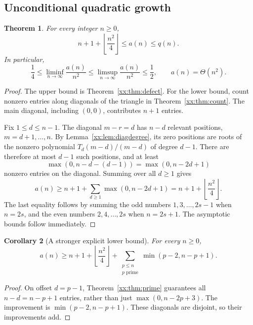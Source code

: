 \documentclass[11pt,a4paper]{article}
\numberwithin{equation}{section}
\newtheorem{theorem}{Theorem}[section]
\newtheorem{corollary}[theorem]{Corollary}
\theoremstyle{definition}
\theoremstyle{remark}
\theoremstyle{plain}
\begin{document}
\subsection{Unconditional quadratic growth}\label{xx:sec:bounds}

\begin{theorem}\label{xx:thm:bounds}
For every integer $n\ge0$,
\begin{equation}\label{xx:eq:bounds}
 n+1+\left\lfloor\frac{n^2}{4}\right\rfloor\le a(n)\le q(n).
\end{equation}
In particular,
\[
 \frac14\le\liminf_{n\to\infty}\frac{a(n)}{n^2}
 \le\limsup_{n\to\infty}\frac{a(n)}{n^2}\le\frac12,
 \qquad a(n)=\Theta(n^2).
\]
\end{theorem}
\begin{proof}
The upper bound is Theorem~\ref{xx:thm:defect}. For the lower bound, count
nonzero entries along diagonals of the triangle in
Theorem~\ref{xx:thm:count}. The main diagonal, including $(0,0)$, contributes
$n+1$ entries.

Fix $1\le d\le n-1$. The diagonal $m-r=d$ has $n-d$ relevant positions,
$m=d+1,\ldots,n$. By Lemma~\ref{xx:lem:diagdegree}, its zero positions are
roots of the nonzero polynomial $T_d(m-d)/(m-d)$ of degree $d-1$.
There are therefore at most $d-1$ such positions, and at least
\[
 \max(0,n-d-(d-1))=\max(0,n-2d+1)
\]
nonzero entries on the diagonal. Summing over all $d\ge1$ gives
\[
 a(n)\ge n+1+\sum_{d\ge1}\max(0,n-2d+1)
       =n+1+\left\lfloor\frac{n^2}{4}\right\rfloor.
\]
The last equality follows by summing the odd numbers $1,3,\ldots,2s-1$
when $n=2s$, and the even numbers $2,4,\ldots,2s$ when $n=2s+1$.
The asymptotic bounds follow immediately.
\end{proof}

\begin{corollary}[A stronger explicit lower bound]\label{xx:cor:primebound}
For every $n\ge0$,
\begin{equation}\label{xx:eq:primebound}
 a(n)\ge n+1+\left\lfloor\frac{n^2}{4}\right\rfloor
       +\sum_{\substack{p\le n\\p\text{ prime}}}\min(p-2,n-p+1).
\end{equation}
\end{corollary}
\begin{proof}
On offset $d=p-1$, Theorem~\ref{xx:thm:prime} guarantees all $n-d=n-p+1$
entries, rather than just $\max(0,n-2p+3)$. The improvement is
$\min(p-2,n-p+1)$. These diagonals are disjoint, so their improvements add.
\end{proof}
\end{document}
